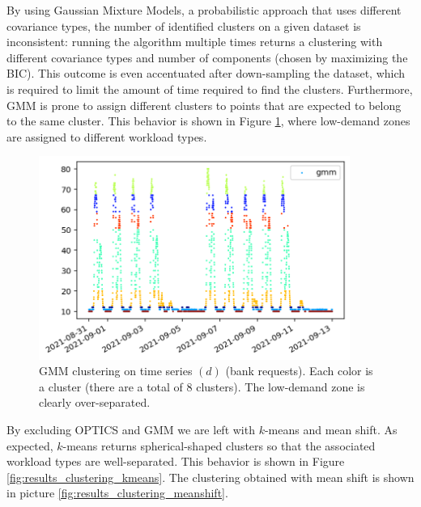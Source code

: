 \documentclass[a4paper, 12pt]{article} %
\begin{document}
	By using Gaussian Mixture Models, a probabilistic approach that uses different covariance types, the number of identified clusters on a given dataset is inconsistent: running the algorithm multiple times returns a clustering with different covariance types and number of components (chosen by maximizing the BIC). This outcome is even accentuated after down-sampling the dataset, which is required to limit the amount of time required to find the clusters. Furthermore, GMM is prone to assign different clusters to points that are expected to belong to the same cluster. This behavior is shown in Figure \ref{fig:results_gmm}, where low-demand zones are assigned to different workload types.
	
	\begin{figure}
		\includegraphics[width=4in]{img/results_clustering_gmm.png}
		\caption{GMM clustering on time series $(d)$ (bank requests). Each color is a cluster (there are a total of 8 clusters). The low-demand zone is clearly over-separated.}
		\label{fig:results_gmm}
	\end{figure}

	By excluding OPTICS and GMM we are left with $k$-means and mean shift. As expected, $k$-means returns spherical-shaped clusters so that the associated workload types are well-separated. This behavior is shown in Figure \ref{fig:results_clustering_kmeans}. The clustering obtained with mean shift is shown in picture \ref{fig:results_clustering_meanshift}.
	
\end{document}
